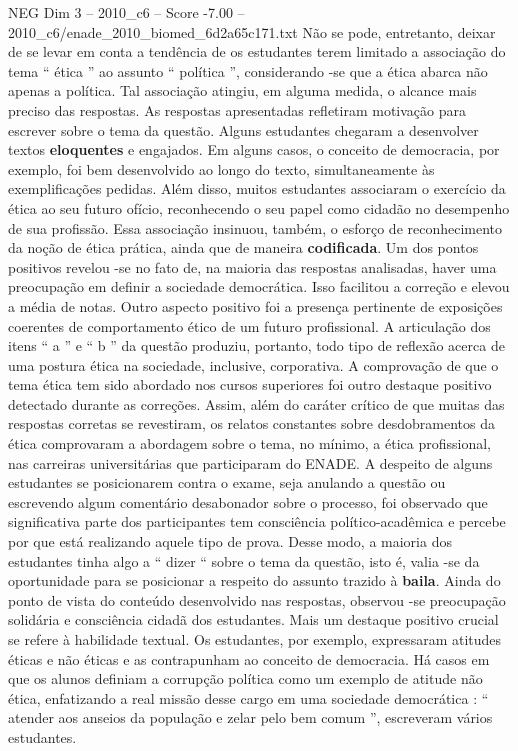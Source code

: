 \begin{textsample}{NEG Dim 3 – 2010\_c6 – Score -7.00 – 2010\_c6/enade\_2010\_biomed\_6d2a65c171.txt}
Não se pode, entretanto, deixar de se levar em conta a tendência de os estudantes terem limitado a associação do tema “ ética ” ao assunto “ política ”, considerando -se que a ética abarca não apenas a política.
Tal associação atingiu, em alguma medida, o alcance mais preciso das respostas.
As respostas apresentadas refletiram motivação para escrever sobre o tema da questão.
Alguns estudantes chegaram a desenvolver textos \textbf{eloquentes} e engajados.
Em alguns casos, o conceito de democracia, por exemplo, foi bem desenvolvido ao longo do texto, simultaneamente às exemplificações pedidas.
Além disso, muitos estudantes associaram o exercício da ética ao seu futuro ofício, reconhecendo o seu papel como cidadão no desempenho de sua profissão.
Essa associação insinuou, também, o esforço de reconhecimento da noção de ética prática, ainda que de maneira \textbf{codificada}.
Um dos pontos positivos revelou -se no fato de, na maioria das respostas analisadas, haver uma preocupação em definir a sociedade democrática.
Isso facilitou a correção e elevou a média de notas.
Outro aspecto positivo foi a presença pertinente de exposições coerentes de comportamento ético de um futuro profissional.
A articulação dos itens “ a ” e “ b ” da questão produziu, portanto, todo tipo de reflexão acerca de uma postura ética na sociedade, inclusive, corporativa.
A comprovação de que o tema ética tem sido abordado nos cursos superiores foi outro destaque positivo detectado durante as correções.
Assim, além do caráter crítico de que muitas das respostas corretas se revestiram, os relatos constantes sobre desdobramentos da ética comprovaram a abordagem sobre o tema, no mínimo, a ética profissional, nas carreiras universitárias que participaram do ENADE.
A despeito de alguns estudantes se posicionarem contra o exame, seja anulando a questão ou escrevendo algum comentário desabonador sobre o processo, foi observado que significativa parte dos participantes tem consciência político-acadêmica e percebe por que está realizando aquele tipo de prova.
Desse modo, a maioria dos estudantes tinha algo a “ dizer “ sobre o tema da questão, isto é, valia -se da oportunidade para se posicionar a respeito do assunto trazido à \textbf{baila}.
Ainda do ponto de vista do conteúdo desenvolvido nas respostas, observou -se preocupação solidária e consciência cidadã dos estudantes.
Mais um destaque positivo crucial se refere à habilidade textual.
Os estudantes, por exemplo, expressaram atitudes éticas e não éticas e as contrapunham ao conceito de democracia.
Há casos em que os alunos definiam a corrupção política como um exemplo de atitude não ética, enfatizando a real missão desse cargo em uma sociedade democrática : “ atender aos anseios da população e zelar pelo bem comum ”, escreveram vários estudantes.

\end{textsample}
